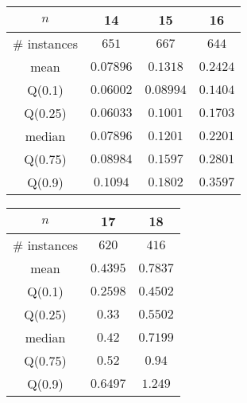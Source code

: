\begin{tabular}{c|ccc} 
\hline 
$n$ & 14 & 15 & 16 \tabularnewline 
\hline 
\hline 
\# instances & $651$ & $667$ & $644$ \tabularnewline 
mean & $0.07896$ & $0.1318$ & $0.2424$ \tabularnewline 
Q(0.1) & $0.06002$ & $0.08994$ & $0.1404$ \tabularnewline 
Q(0.25) & $0.06033$ & $0.1001$ & $0.1703$ \tabularnewline 
median & $0.07896$ & $0.1201$ & $0.2201$ \tabularnewline 
Q(0.75) & $0.08984$ & $0.1597$ & $0.2801$ \tabularnewline 
Q(0.9) & $0.1094$ & $0.1802$ & $0.3597$ \tabularnewline 
\hline 
\end{tabular} 
\medskip{} 

\begin{tabular}{c|cc} 
\hline 
$n$ & 17 & 18 \tabularnewline 
\hline 
\hline 
\# instances & $620$ & $416$ \tabularnewline 
mean & $0.4395$ & $0.7837$ \tabularnewline 
Q(0.1) & $0.2598$ & $0.4502$ \tabularnewline 
Q(0.25) & $0.33$ & $0.5502$ \tabularnewline 
median & $0.42$ & $0.7199$ \tabularnewline 
Q(0.75) & $0.52$ & $0.94$ \tabularnewline 
Q(0.9) & $0.6497$ & $1.249$ \tabularnewline 
\hline 
\end{tabular} 
\medskip{} 

